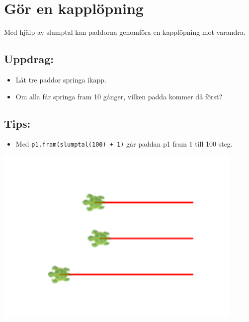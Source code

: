 \chapter{Gör en kapplöpning}
\begin{multicols}{2}
Med hjälp av slumptal kan paddorna genomföra en kapplöpning mot varandra.
\section*{\color{BrickRed}Uppdrag:}


\begin{itemize}

\item {Låt tre paddor springa ikapp.}
\item {Om alla får springa fram 10 gånger, vilken padda kommer då först?}

\end{itemize}


\section*{\color{OliveGreen}Tips:}


\begin{itemize}

\item {Med \lstinline{p1.fram(slumptal(100) + 1)} går paddan p1 fram 1 till 100 steg.}

\end{itemize}



\columnbreak

\begin{center}
\includegraphics[width=12.0cm]{../img/race.png}
\end{center}

\end{multicols}

